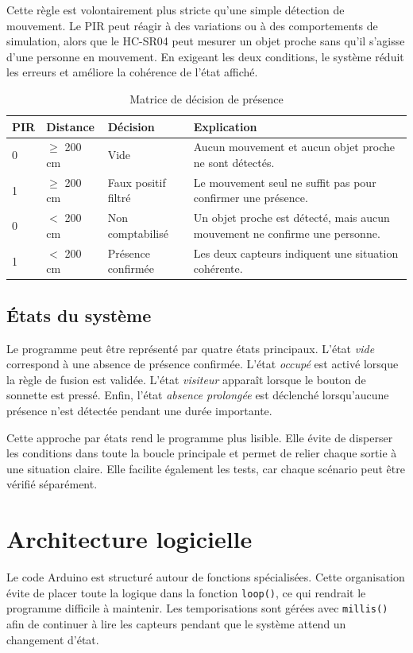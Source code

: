 \documentclass[12pt,a4paper]{report}
\begin{document}
Cette règle est volontairement plus stricte qu'une simple détection de mouvement. Le PIR peut réagir à des variations ou à des comportements de simulation, alors que le HC-SR04 peut mesurer un objet proche sans qu'il s'agisse d'une personne en mouvement. En exigeant les deux conditions, le système réduit les erreurs et améliore la cohérence de l'état affiché.

\begin{table}[H]
  \centering
  \caption{Matrice de décision de présence}
  \begin{tabular}{p{2cm}p{3.5cm}p{4cm}p{5cm}}
    \toprule
    \rowcolor{TableHead}
    \textbf{PIR} & \textbf{Distance} & \textbf{Décision} & \textbf{Explication} \\
    \midrule
    0 & $\geq$ 200 cm & Vide & Aucun mouvement et aucun objet proche ne sont détectés. \\
    1 & $\geq$ 200 cm & Faux positif filtré & Le mouvement seul ne suffit pas pour confirmer une présence. \\
    0 & $<$ 200 cm & Non comptabilisé & Un objet proche est détecté, mais aucun mouvement ne confirme une personne. \\
    1 & $<$ 200 cm & Présence confirmée & Les deux capteurs indiquent une situation cohérente. \\
    \bottomrule
  \end{tabular}
\end{table}

\section{États du système}
Le programme peut être représenté par quatre états principaux. L'état \textit{vide} correspond à une absence de présence confirmée. L'état \textit{occupé} est activé lorsque la règle de fusion est validée. L'état \textit{visiteur} apparaît lorsque le bouton de sonnette est pressé. Enfin, l'état \textit{absence prolongée} est déclenché lorsqu'aucune présence n'est détectée pendant une durée importante.

Cette approche par états rend le programme plus lisible. Elle évite de disperser les conditions dans toute la boucle principale et permet de relier chaque sortie à une situation claire. Elle facilite également les tests, car chaque scénario peut être vérifié séparément.

\chapter{Architecture logicielle}
Le code Arduino est structuré autour de fonctions spécialisées. Cette organisation évite de placer toute la logique dans la fonction \texttt{loop()}, ce qui rendrait le programme difficile à maintenir. Les temporisations sont gérées avec \texttt{millis()} afin de continuer à lire les capteurs pendant que le système attend un changement d'état.
\end{document}
